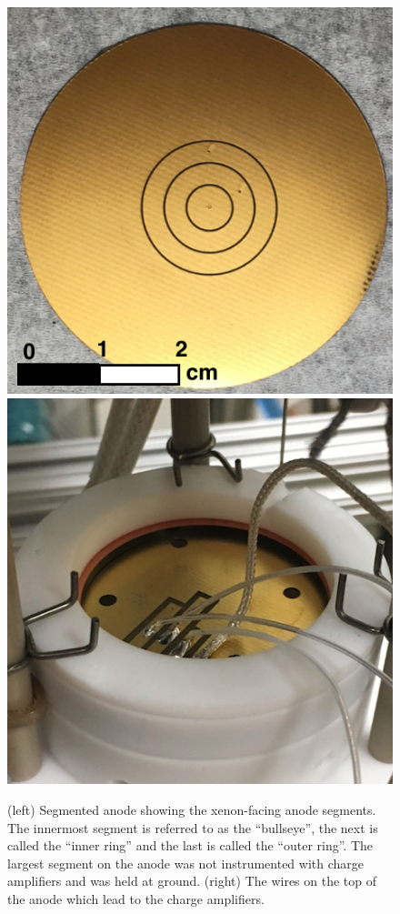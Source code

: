 \begin{figure}[htbp]
\begin{center}
\includegraphics[width=\halffig]{figures/testbed/anode.png}
\includegraphics[width=\halffig]{figures/testbed/anode2.png}
\caption{(left) Segmented anode showing the xenon-facing anode segments. The innermost segment is referred to as the ``bullseye'', the next is called the ``inner ring'' and the last is called the ``outer ring''. The largest segment on the anode was not instrumented with charge amplifiers and was held at ground. (right) The wires on the top of the anode which lead to the charge amplifiers.}
\label{fig:anode}
\end{center}
\end{figure}

